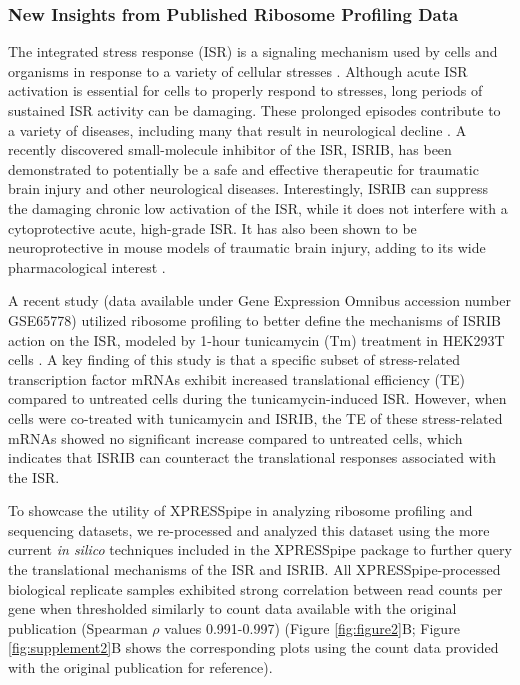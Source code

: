 \documentclass[10pt, oneside]{article}
\begin{document}
\subsubsection{New Insights from Published Ribosome Profiling Data}
The integrated stress response (ISR) is a signaling mechanism used by cells and organisms in response to a variety of cellular stresses \cite{harding_isr}. Although acute ISR activation is essential for cells to properly respond to stresses, long periods of sustained ISR activity can be damaging. These prolonged episodes contribute to a variety of diseases, including many that result in neurological decline \cite{isr_disease}. A recently discovered small-molecule inhibitor of the ISR, ISRIB, has been demonstrated to potentially be a safe and effective therapeutic for traumatic brain injury and other neurological diseases. Interestingly, ISRIB can suppress the damaging chronic low activation of the ISR, while it does not interfere with a cytoprotective acute, high-grade ISR. It has also been shown to be neuroprotective in mouse models of traumatic brain injury, adding to its wide pharmacological interest \cite{isrib_activation, isrib_structure, isrib_riboseq, isrib_neuroprotective, isrib_neuroprotective2, isrib_neuroprotective3, isrib_neuroprotective4}. \par

A recent study (data available under Gene Expression Omnibus accession number GSE65778) utilized ribosome profiling to better define the mechanisms of ISRIB action on the ISR, modeled by 1-hour tunicamycin (Tm) treatment in HEK293T cells \cite{isrib_riboseq}. A key finding of this study is that a specific subset of stress-related transcription factor mRNAs exhibit increased translational efficiency (TE) compared to untreated cells during the tunicamycin-induced ISR. However, when cells were co-treated with tunicamycin and ISRIB, the TE of these stress-related mRNAs showed no significant increase compared to untreated cells, which indicates that ISRIB can counteract the translational responses associated with the ISR. \par

To showcase the utility of XPRESSpipe in analyzing ribosome profiling and sequencing datasets, we re-processed and analyzed this dataset using the more current \textit{in silico} techniques included in the XPRESSpipe package to further query the translational mechanisms of the ISR and ISRIB. All XPRESSpipe-processed biological replicate samples exhibited strong correlation between read counts per gene when thresholded similarly to count data available with the original publication (Spearman $\rho$ values 0.991-0.997) (Figure \ref{fig:figure2}B; Figure \ref{fig:supplement2}B shows the corresponding plots using the count data provided with the original publication for reference). \par
\end{document}
